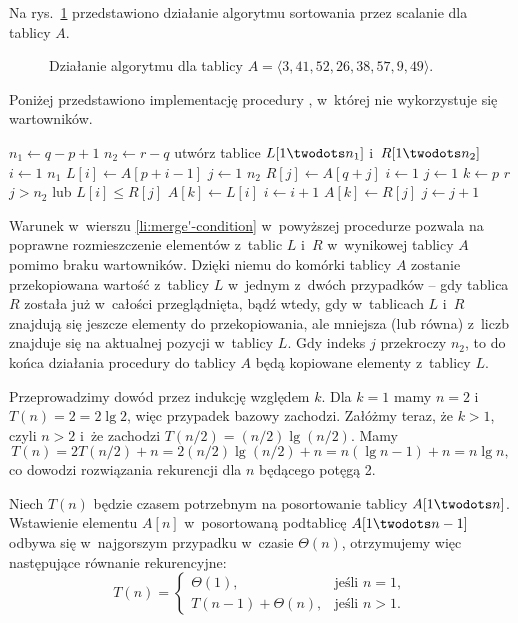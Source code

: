 
\exercise %
Na rys.\ \ref{fig:2.3-1} przedstawiono działanie algorytmu sortowania przez scalanie dla tablicy $A$.
\begin{figure}[ht]
	\centering 
	\caption{Działanie algorytmu  dla tablicy $A=\langle3,41,52,26,38,57,9,49\rangle$.} \label{fig:2.3-1}
\end{figure}

\exercise %
Poniżej przedstawiono implementację procedury , w~której nie wykorzystuje się wartowników.
\begin{codebox}
\li	$n_1\gets q-p+1$
\li	$n_2\gets r-q$
\li	utwórz tablice $L[1\twodots n_1]$ i~$R[1\twodots n_2]$
\li	\For $i\gets1$ \To $n_1$
\li		\Do $L[i]\gets A[p+i-1]$
		\End
\li	\For $j\gets1$ \To $n_2$
\li		\Do $R[j]\gets A[q+j]$
		\End
\li	$i\gets1$
\li $j\gets1$
\li \For $k\gets p$ \To $r$
\li		\Do
			\If $j>n_2$ lub $L[i]\le R[j]$ \label{li:merge'-condition}
\li				\Then
					$A[k]\gets L[i]$
\li					$i\gets i+1$
\li				\Else
					$A[k]\gets R[j]$
\li					$j\gets j+1$
				\End
		\End
\end{codebox}
Warunek w~wierszu \ref{li:merge'-condition} w~powyższej procedurze pozwala na poprawne rozmieszczenie elementów z~tablic $L$ i~$R$ w~wynikowej tablicy $A$ pomimo braku wartowników.
Dzięki niemu do  komórki tablicy $A$ zostanie przekopiowana wartość z~tablicy $L$ w~jednym z~dwóch przypadków -- gdy tablica $R$ została już w~całości przeglądnięta, bądź wtedy, gdy w~tablicach $L$ i~$R$ znajdują się jeszcze elementy do przekopiowania, ale mniejsza (lub równa) z~liczb znajduje się na aktualnej pozycji w~tablicy $L$.
Gdy indeks $j$ przekroczy $n_2$, to do końca działania procedury do tablicy $A$ będą kopiowane elementy z~tablicy $L$.

\exercise %
Przeprowadzimy dowód przez indukcję względem $k$.
Dla $k=1$ mamy $n=2$ i~$T(n)=2=2\lg2$, więc przypadek bazowy zachodzi.
Załóżmy teraz, że $k>1$, czyli $n>2$ i~że zachodzi $T(n/2)=(n/2)\lg(n/2)$.
Mamy
\[
	T(n) = 2T(n/2)+n = 2(n/2)\lg(n/2)+n = n(\lg n-1)+n = n\lg n,
\]
co dowodzi rozwiązania rekurencji dla $n$ będącego potęgą 2.

\exercise %
Niech $T(n)$ będzie czasem potrzebnym na posortowanie tablicy $A[1\twodots n]$.
Wstawienie elementu $A[n]$ w~posortowaną podtablicę $A[1\twodots n-1]$ odbywa się w~najgorszym przypadku w~czasie $\Theta(n)$, otrzymujemy więc następujące równanie rekurencyjne:
\[
	T(n) =
	\begin{cases}
		\Theta(1), & \text{jeśli $n=1$}, \\
		T(n-1)+\Theta(n), & \text{jeśli $n>1$}.
	\end{cases}
\]

